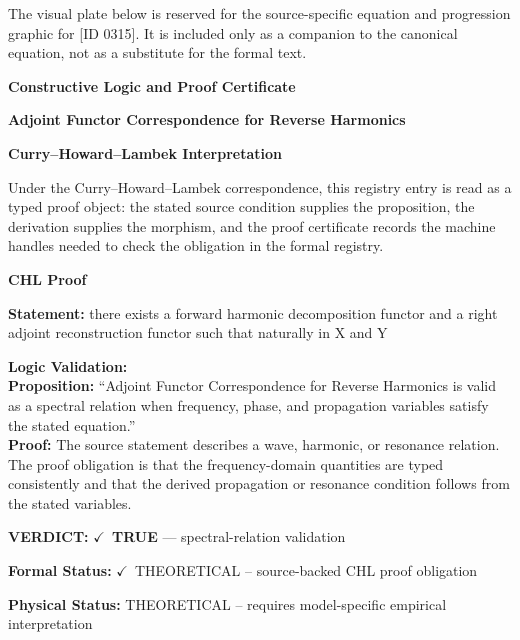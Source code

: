 \begingroup\footnotesize\sloppy
The visual plate below is reserved for the source-specific equation and progression graphic for [ID 0315]. It is included only as a companion to the canonical equation, not as a substitute for the formal text.
\par\endgroup
\ifTZPDarkEdition
{}
\fi

\clearpage
\begingroup\tzpsupportsetup
\noindent\textbf{\fontsize{10.8pt}{12.8pt}\selectfont [ID 0315] Constructive Logic and Proof Certificate}\par
\noindent\textbf{\fontsize{10pt}{12pt}\selectfont Adjoint Functor Correspondence for Reverse Harmonics}\par
\vspace{0.45em}
\begingroup
\footnotesize
\setlength{\parskip}{0.22em}
\setlength{\parindent}{0pt}
\noindent\textbf{Curry--Howard--Lambek Interpretation}\par
Under the Curry--Howard--Lambek correspondence, this registry entry is read as a typed proof
object: the stated source condition supplies the proposition, the derivation supplies the
morphism, and the proof certificate records the machine handles needed to check the obligation
in the formal registry.

\vspace{0.45em}
\noindent\textbf{CHL Proof}\par
\textbf{Statement:} there exists a forward harmonic decomposition functor and a right adjoint reconstruction
functor such that naturally in X and Y

\textbf{Logic Validation:}\\
\textbf{Proposition:} ``Adjoint Functor Correspondence for Reverse Harmonics is valid as a spectral relation
when frequency, phase, and propagation variables satisfy the stated equation.''\\
\textbf{Proof:} The source statement describes a wave, harmonic, or resonance relation. The proof
obligation is that the frequency-domain quantities are typed consistently and that the
derived propagation or resonance condition follows from the stated variables.

\textbf{VERDICT:} \ensuremath{\checkmark}\ \textbf{TRUE} --- spectral-relation validation

\textbf{Formal Status:} \ensuremath{\checkmark}\ THEORETICAL -- source-backed CHL proof obligation

\textbf{Physical Status:} THEORETICAL -- requires model-specific empirical interpretation
\par\vspace{0.45em}
\par
\ifTZPDarkEdition
{}
\fi
\endgroup
\endgroup
